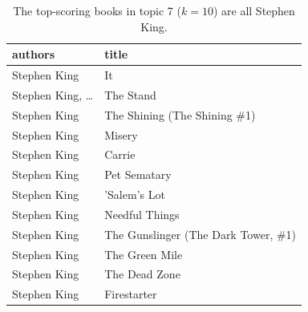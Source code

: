 \documentclass[handout]{beamer}
\begin{document}
\begin{frame}

\begin{table}
\centering
\begin{tabular}{ll}
\toprule
                        authors &                                title \\
\midrule
                   Stephen King &                                   It \\
 Stephen King, \ldots%
 &                            The Stand \\
                   Stephen King &         The Shining (The Shining \#1) \\
                   Stephen King &                               Misery \\
                   Stephen King &                               Carrie \\
                   Stephen King &                         Pet Sematary \\
                   Stephen King &                         'Salem's Lot \\
                   Stephen King &                       Needful Things \\
                   Stephen King &  The Gunslinger (The Dark Tower, \#1)
                    \\
                   Stephen King &                       The Green Mile \\
                   Stephen King &                        The Dead Zone \\
                   Stephen King &                          Firestarter \\
\bottomrule
\end{tabular}
  \caption[Stephen King ($k=10$)]{The top-scoring books in topic 7 ($k=10$) are all Stephen King.}
  \label{tab:stephen-king-10}
\end{table}



\end{frame}
\end{document}
